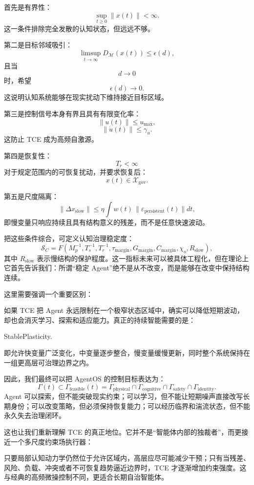 首先是有界性：
\[
\sup_{t\ge0}\|x(t)\|<\infty.
\]
这一条件排除完全发散的认知状态，但远远不够。

第二是目标邻域吸引：
\[
\limsup_{t\to\infty}
D_{\mathcal M}(x(t))
\le
\epsilon(d),
\]
且当
\[
d\to0
\]
时，希望
\[
\epsilon(d)\to0.
\]
这说明认知系统能够在现实扰动下维持接近目标区域。

第三是控制信号本身有界且具有有限变化率：
\[
\|u(t)\|
\le
u_{\max},
\]
\[
\|\dot u(t)\|
\le
\gamma_u.
\]
这防止 TCE 成为高频自激源。

第四是恢复性：
\[
T_r<\infty
\]
对于规定范围内的可恢复扰动，并要求恢复后：
\[
x(t)
\in
\mathcal X_{\mathrm{gov}}.
\]

第五是尺度隔离：
\[
\|\Delta x_{\mathrm{slow}}\|
\le
\eta
\int
w(t)\,
\|\varepsilon_{\mathrm{persistent}}(t)\|dt,
\]
即慢变量只响应持续且具有结构意义的残差，而不是任意快速波动。

把这些条件综合，可定义认知治理稳定度：
\[
\mathcal S_C
=
F
\left(
M_p^{-1},
T_s^{-1},
T_r^{-1},
\tau_{\mathrm{margin}},
G_{\mathrm{margin}},
C_{\mathrm{margin}},
\chi_o,
R_{\mathrm{slow}}
\right),
\]
其中 $R_{\mathrm{slow}}$ 表示慢结构的保护程度。这一指标未来可以被具体工程化，但在理论上它首先告诉我们：所谓“稳定 Agent”绝不是从不改变，而是能够在改变中保持结构连续。

这里需要强调一个重要区别：
\begin{statementbox}
\centering
{}
\end{statementbox}
如果 TCE 把 Agent 永远限制在一个极窄状态区域中，确实可以降低短期波动，却也会消灭学习、探索和适应能力。真正的持续智能需要的是：
\begin{statementbox}
StablePlasticity.
\end{statementbox}
即允许快变量广泛变化，中变量逐步整合，慢变量缓慢更新，同时整个系统保持在一组更高层可治理边界之内。

因此，我们最终可以把 AgentOS 的控制目标表达为：
\[
\boxed{
\Gamma(t)
\subset
\Gamma_{\mathrm{feasible}}(t)
=
\Gamma_{\mathrm{physical}}
\cap
\Gamma_{\mathrm{cognitive}}
\cap
\Gamma_{\mathrm{safety}}
\cap
\Gamma_{\mathrm{identity}}.
}
\]
Agent 可以探索，但不能突破现实约束；可以学习，但不能让短期噪声直接改写长期身份；可以改变策略，但必须保持恢复能力；可以经历临界和湍流状态，但不能永久失去治理闭环。

这也让我们重新理解 TCE 的真正地位。它并不是“智能体内部的独裁者”，而更接近一个多尺度约束场执行器：
\begin{statementbox}
\centering
{}
\end{statementbox}
只要局部认知动力学仍然位于允许区域内，高层应尽可能减少干预；只有当残差、风险、负载、冲突或者不可恢复趋势逼近边界时，TCE 才逐渐增加约束强度。这与经典的高频微操控制不同，更适合长期自治智能体。

